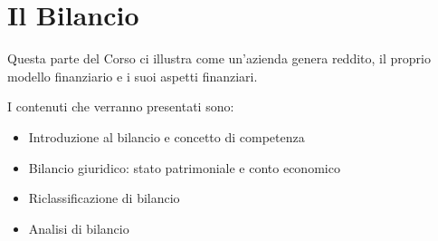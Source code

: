 \section{Il Bilancio}
Questa parte del Corso ci illustra come un'azienda genera reddito, il proprio modello finanziario e i suoi aspetti finanziari.

I contenuti che verranno presentati sono:
\begin{itemize}
	\item Introduzione al bilancio e concetto di competenza
	\item Bilancio giuridico: stato patrimoniale e conto economico
	\item Riclassificazione di bilancio
	\item Analisi di bilancio
\end{itemize}



